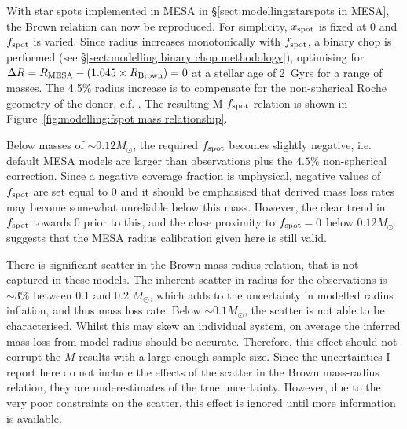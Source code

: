 With star spots implemented in MESA in \S\ref{sect:modelling:starspots in MESA}, the Brown relation can now be reproduced.
For simplicity, $x_{\rm spot}$ is fixed at 0 and $f_{\rm spot}$ is varied.
Since radius increases monotonically with $f_{\rm spot}$, a binary chop is performed (see \S\ref{sect:modelling:binary chop methodology}), optimising for $\Delta R=R_{\rm MESA}-(1.045\times R_{\rm Brown})=0$ at a stellar age of 2~Gyrs for a range of masses. The 4.5\% radius increase is to compensate for the non-spherical Roche geometry of the donor, c.f. \citet{knigge11}.
The resulting M-$f_{\rm spot}$ relation is shown in Figure~\ref{fig:modelling:fspot mass relationship}.

Below masses of $\sim 0.12 M_\odot$, the required $f_{\rm spot}$ becomes slightly negative, i.e. default MESA models are larger than observations plus the $4.5\%$ non-spherical correction.
Since a negative coverage fraction is unphysical, negative values of $f_{\rm spot}$ are set equal to 0 and it should be emphasised that derived mass loss rates may become somewhat unreliable below this mass.
However, the clear trend in $f_{\rm spot}$ towards 0 prior to this, and the close proximity to $f_{\rm spot} = 0$ below $0.12 M_\odot$ suggests that the MESA radius calibration given here is still valid.

There is significant scatter in the Brown mass-radius relation, that is not captured in these models. The inherent scatter in radius for the observations is $\sim 3\%$ between 0.1 and 0.2 $M_\odot$, which adds to the uncertainty in modelled radius inflation, and thus mass loss rate. Below $\sim 0.1 M_\odot$, the scatter is not able to be characterised.
Whilst this may skew an individual system, on average the inferred mass loss from model radius should be accurate. Therefore, this effect should not corrupt the $\dot M$ results with a large enough sample size.
Since the uncertainties I report here do not include the effects of the scatter in the Brown mass-radius relation, they are underestimates of the true uncertainty. However, due to the very poor constraints on the scatter, this effect is ignored until more information is available.

